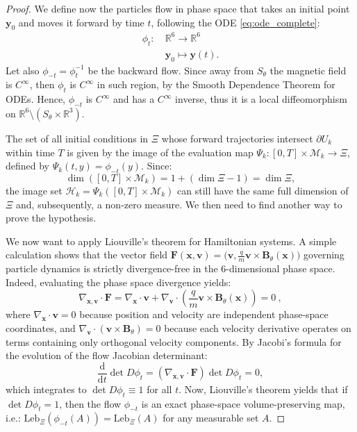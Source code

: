 \documentclass{article}
\begin{document}
\begin{proof}
		We define now the particles flow in phase space that takes an initial point $\mathbf{y}_0$ and moves it forward by time $t$, following the ODE \eqref{eq:ode_complete}:
		\begin{align*}
			\phi_t: & \ \mathbb{R}^6 \to \mathbb{R}^6 \\
			& \ \mathbf{y}_0 \mapsto \mathbf{y}(t).
		\end{align*}
		Let also $\phi_{-t} = \phi_t^{-1}$ be the backward flow. Since away from $S_\theta$ the magnetic field is $C^\infty$, then $\phi_t$ is $C^\infty$ in such region, by the Smooth Dependence Theorem for ODEs. Hence, $\phi_{-t}$ is $C^\infty$ and has a $C^\infty$ inverse, thus it is a local diffeomorphism on $\mathbb{R}^6 \setminus (S_\theta \times \mathbb{R}^3)$. 
		
		The set of all initial conditions in $\Xi$ whose forward trajectories intersect $\partial U_k$ within time $T$ is given by the image of the evaluation map $\Psi_k : [0,T] \times \mathcal{M}_k \to \Xi$, defined by $\Psi_k(t, y) = \phi_{-t}(y)$. Since:
		\begin{equation}
			\dim([0,T] \times \mathcal{M}_k) = 1 + (\dim \Xi - 1) = \dim \Xi,
		\end{equation}
		the image set $\mathcal{H}_k = \Psi_k([0,T] \times \mathcal{M}_k)$ can still have the same full dimension of $\Xi$ and, subsequently, a non-zero measure. We then need to find another way to prove the hypothesis.
		
		We now want to apply Liouville's theorem for Hamiltonian systems. A simple calculation shows that the vector field $\mathbf{F}(\mathbf{x},\mathbf{v}) = \big(\mathbf{v}, \frac{q}{m}\mathbf{v} \times \mathbf{B}_\theta(\mathbf{x})\big)$ governing particle dynamics is strictly divergence-free in the 6-dimensional phase space. Indeed, evaluating the phase space divergence yields:
		\begin{equation}
			\nabla_{\mathbf{x},\mathbf{v}} \cdot \mathbf{F} = \nabla_{\mathbf{x}} \cdot \mathbf{v} + \nabla_{\mathbf{v}} \cdot \left( \frac{q}{m} \mathbf{v} \times \mathbf{B}_\theta(\mathbf{x}) \right) = 0 \ ,
		\end{equation}
		where $\nabla_{\mathbf{x}} \cdot \mathbf{v} = 0$ because position and velocity are independent phase-space coordinates, and $\nabla_{\mathbf{v}} \cdot (\mathbf{v} \times \mathbf{B}_\theta) = 0$ because each velocity derivative operates on terms containing only orthogonal velocity components. By Jacobi's formula for the evolution of the flow Jacobian determinant:
		\begin{equation}
			\frac{\mathrm{d}}{\mathrm{d}t} \det D\phi_t = (\nabla_{\mathbf{x},\mathbf{v}} \cdot \mathbf{F}) \det D\phi_t = 0,
		\end{equation}
		which integrates to $\det D\phi_t \equiv 1$ for all $t$. Now, Liouville's theorem yields that if $\det D\phi_t = 1$, then the flow $\phi_{-t}$ is an exact phase-space volume-preserving map, i.e.: $\mathrm{Leb}_\Xi(\phi_{-t}(A)) = \mathrm{Leb}_\Xi(A)$ for any measurable set $A$. 
		

\end{proof}
\end{document}

